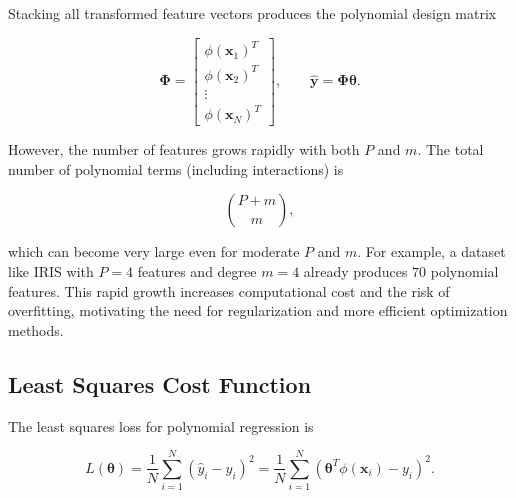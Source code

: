 \documentclass{article}
\begin{document}
Stacking all transformed feature vectors produces the polynomial design matrix

\[
\boldsymbol{\Phi} =
\begin{bmatrix}
\phi(\mathbf{x}_1)^T \\
\phi(\mathbf{x}_2)^T \\
\vdots \\
\phi(\mathbf{x}_N)^T
\end{bmatrix},
\qquad
\hat{\mathbf{y}} = \boldsymbol{\Phi}\boldsymbol{\theta}.
\]

However, the number of features grows rapidly with both $P$ and $m$. The total number of polynomial terms (including interactions) is

\[
\binom{P + m}{m},
\]

which can become very large even for moderate $P$ and $m$. For example, a dataset like IRIS with $P=4$ features and degree $m=4$ already produces $70$ polynomial features. This rapid growth increases computational cost and the risk of overfitting, motivating the need for regularization and more efficient optimization methods.






\subsection{Least Squares Cost Function}

The least squares loss for polynomial regression is

\[
L(\boldsymbol{\theta}) 
= \frac{1}{N} \sum_{i=1}^{N} (\hat{y}_i - y_i)^2 
= \frac{1}{N} \sum_{i=1}^{N} (\boldsymbol{\theta}^T \phi(\mathbf{x}_i) - y_i)^2.
\]
\end{document}
